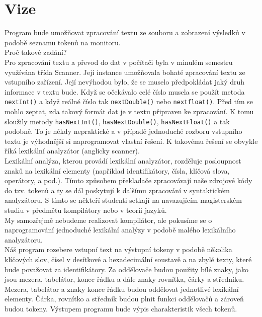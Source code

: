 \section {Vize}
\label{sec:vize}

Program  bude umožňovat zpracování textu ze souboru a zobrazení výsledků v podobě seznamu tokenů na monitoru.\\

Proč takové zadání?\\

Pro zpracování textu a převod do dat v počítači byla v minulém semestru využívána třída Scanner. 
Její instance umožňovala bohaté zpracování textu ze vstupního zařízení. 
Její nevýhodou bylo, že se muselo předpokládat jaký druh informace v textu bude. 
Když se očekávalo celé číslo musela se použít metoda \lstinline|nextInt()| a když reálné číslo tak \lstinline|nextDouble()| nebo  \lstinline|nextfloat()|.
Před tím se mohlo zeptat, zda takový formát dat je v textu připraven ke zpracování. 
K tomu sloužily metody \lstinline|hasNextInt()|, \lstinline|hasNextDouble()|, \lstinline|hasNextFloat()| a tak podobně. 
To je někdy nepraktické a v případě jednoduché rozboru vstupního textu je výhodnější si naprogramovat vlastní řešení. 
K takovému řešení se obvykle říká lexikální analyzátor (anglicky scanner).\\

Lexikální analýza, kterou provádí lexikální analyzátor, rozděluje posloupnost znaků na lexikální elementy (například identifikátory, čísla, klíčová slova, operátory, a pod.). 
Tímto způsobem překladače zpracovávají naše zdrojové kódy do tzv. tokenů a ty se dál poskytují k dalšímu zpracování v syntaktickém analyzátoru.
S tímto se někteří studenti setkají na navazujícím magisterském studiu v předmětu kompilátory nebo v teorii jazyků.\\

My samozřejmě nebudeme realizovat kompilátor, ale pokusíme se o naprogramování jednoduché lexikální analýzy v podobě malého lexikálního analyzátoru.\\

Náš program rozebere vstupní text na výstupní tokeny v podobě několika klíčových slov, čísel v desítkové a hexadecimální soustavě a na zbylé texty, které bude považovat za identifikátory. 
Za oddělovače budou použity bílé znaky, jako jsou mezera, tabelátor, konec řádku a dále znaky rovnítka, čárky a středníku.
Mezera, tabelátor a znaky konce řádku budou oddělovat jednotlivé lexikální elementy. 
Čárka, rovnítko a středník budou plnit funkci oddělovačů a zároveň budou tokeny.
Výstupem programu bude výpis charakteristik všech tokenů.
\\

